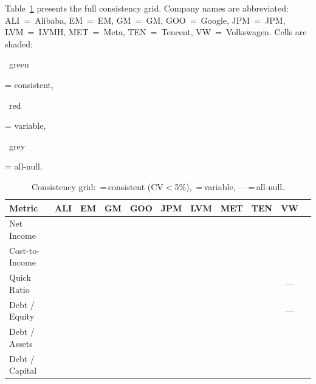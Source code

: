 \documentclass[12pt, a4paper]{article}
\newcommand{\cmark}{\textcolor{green!60!black}{\ding{51}}}  %
\newcommand{\xmark}{\textcolor{red!70!black}{\ding{55}}}    %
\newcommand{\nmark}{\textcolor{gray}{---}}                   %
\begin{document}
Table~\ref{tab:grid} presents the full consistency grid.  Company names are
abbreviated: ALI~=~Alibaba, EM~=~EM, GM~=~GM, GOO~=~Google, JPM~=~JPM,
LVM~=~LVMH, MET~=~Meta, TEN~=~Tencent, VW~=~Volkswagen.
Cells are shaded: \colorbox{consistent}{\strut\ green~} = consistent,
\colorbox{variable}{\strut\ red~} = variable,
\colorbox{allnull}{\strut\ grey~} = all-null.

\begin{table}[H]
\centering
\caption{Consistency grid: \cmark\,=\,consistent (CV$<$5\%),
         \xmark\,=\,variable, \nmark\,=\,all-null.}
\label{tab:grid}
\setlength{\tabcolsep}{5pt}
\begin{tabular}{lcccccccccc}
\toprule
\textbf{Metric} &
  \textbf{ALI} & \textbf{EM} & \textbf{GM} & \textbf{GOO} &
  \textbf{JPM} & \textbf{LVM} & \textbf{MET} & \textbf{TEN} & \textbf{VW} \\
\midrule
Net Income
  & \cellcolor{consistent}\cmark & \cellcolor{consistent}\cmark
  & \cellcolor{consistent}\cmark & \cellcolor{consistent}\cmark
  & \cellcolor{consistent}\cmark & \cellcolor{consistent}\cmark
  & \cellcolor{consistent}\cmark & \cellcolor{consistent}\cmark
  & \cellcolor{consistent}\cmark \\
Cost-to-Income
  & \cellcolor{variable}\xmark & \cellcolor{variable}\xmark
  & \cellcolor{variable}\xmark & \cellcolor{variable}\xmark
  & \cellcolor{variable}\xmark & \cellcolor{variable}\xmark
  & \cellcolor{variable}\xmark & \cellcolor{variable}\xmark
  & \cellcolor{variable}\xmark \\
Quick Ratio
  & \cellcolor{variable}\xmark & \cellcolor{consistent}\cmark
  & \cellcolor{variable}\xmark & \cellcolor{consistent}\cmark
  & \cellcolor{variable}\xmark & \cellcolor{variable}\xmark
  & \cellcolor{consistent}\cmark & \cellcolor{variable}\xmark
  & \cellcolor{allnull}\nmark \\
Debt / Equity
  & \cellcolor{consistent}\cmark & \cellcolor{consistent}\cmark
  & \cellcolor{consistent}\cmark & \cellcolor{consistent}\cmark
  & \cellcolor{variable}\xmark & \cellcolor{variable}\xmark
  & \cellcolor{consistent}\cmark & \cellcolor{consistent}\cmark
  & \cellcolor{allnull}\nmark \\
Debt / Assets
  & \cellcolor{consistent}\cmark & \cellcolor{consistent}\cmark
  & \cellcolor{variable}\xmark & \cellcolor{variable}\xmark
  & \cellcolor{variable}\xmark & \cellcolor{variable}\xmark
  & \cellcolor{consistent}\cmark & \cellcolor{consistent}\cmark
  & \cellcolor{variable}\xmark \\
Debt / Capital

\end{tabular}
\end{table}
\end{document}
